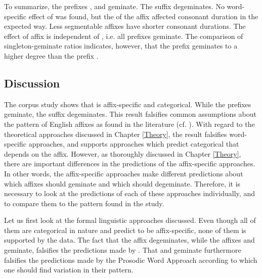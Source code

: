 To summarize, the prefixes ,  and  geminate. The suffix  degeminates. No word-specific effect of  was found, but the  of the affix affected consonant duration in the expected way. Less segmentable affixes have shorter consonant durations. The effect of affix is independent of , i.e. all prefixes geminate. The comparison of singleton-geminate ratios indicates, however, that the prefix  geminates to a higher degree than the prefix .

\subsection{Discussion}


The corpus study shows that  is affix-specific and categorical. While the prefixes geminate, the suffix  degeminates. 
This result falsifies common assumptions about the  pattern of English affixes as found in the literature (cf. ). 
With regard to the theoretical approaches discussed in Chapter \ref{Theory}, the result falsifies word-specific approaches, and supports approaches which predict categorical  that depends on the affix. However, as thoroughly discussed in Chapter \ref{Theory}, there are important differences in the predictions of the affix-specific approaches. In other words, the affix-specific approaches make different predictions about which affixes should geminate and which should degeminate. Therefore, it is necessary to look at the predictions of each of these approaches individually, and to compare them to the  pattern found in the study.

Let us first look at the formal linguistic approaches discussed. Even though all of them are categorical in nature and predict  to be affix-specific, none of them is supported by the data. The fact that the  affix  degeminates, while the  affixes  and  geminate, falsifies the predictions made by . That  and  geminate furthermore falsifies the predictions made by the Prosodic Word Approach according to which one should find variation in their  pattern. 

